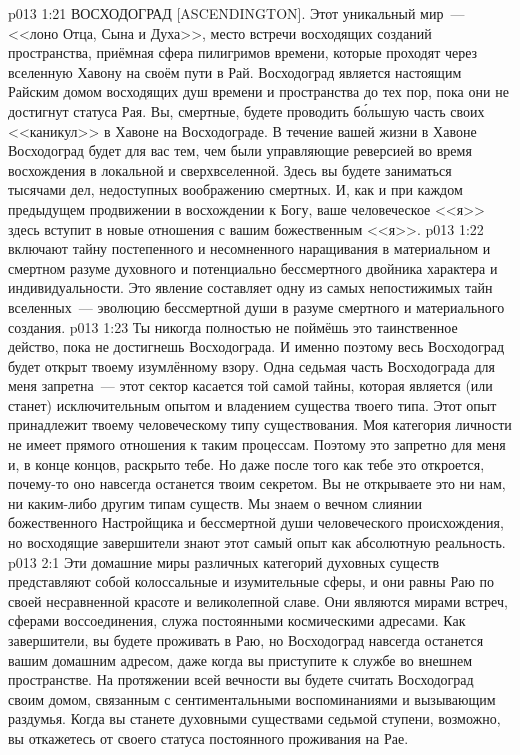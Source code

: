 \vs p013 1:21 ВОСХОДОГРАД [ASCENDINGTON]. Этот уникальный мир~--- <<лоно Отца, Сына и Духа>>, место встречи восходящих созданий пространства, приёмная сфера пилигримов времени, которые проходят через вселенную Хавону на своём пути в Рай. Восходоград является настоящим Райским домом восходящих душ времени и пространства до тех пор, пока они не достигнут статуса Рая. Вы, смертные, будете проводить б\'ольшую часть своих <<каникул>> в Хавоне на Восходограде. В течение вашей жизни в Хавоне Восходоград будет для вас тем, чем были управляющие реверсией во время восхождения в локальной и сверхвселенной. Здесь вы будете заниматься тысячами дел, недоступных воображению смертных. И, как и при каждом предыдущем продвижении в восхождении к Богу, ваше человеческое <<я>> здесь вступит в новые отношения с вашим божественным <<я>>.
\vs p013 1:22 \pc {} включают тайну постепенного и несомненного наращивания в материальном и смертном разуме духовного и потенциально бессмертного двойника характера и индивидуальности. Это явление составляет одну из самых непостижимых тайн вселенных~--- эволюцию бессмертной души в разуме смертного и материального создания.
\vs p013 1:23 Ты никогда полностью не поймёшь это таинственное действо, пока не достигнешь Восходограда. И именно поэтому весь Восходоград будет открыт твоему изумлённому взору. Одна седьмая часть Восходограда для меня запретна~--- этот сектор касается той самой тайны, которая является (или станет) исключительным опытом и владением существа твоего типа. Этот опыт принадлежит твоему человеческому типу существования. Моя категория личности не имеет прямого отношения к таким процессам. Поэтому это запретно для меня и, в конце концов, раскрыто тебе. Но даже после того как тебе это откроется, почему\hyp{}то оно навсегда останется твоим секретом. Вы не открываете это ни нам, ни каким\hyp{}либо другим типам существ. Мы знаем о вечном слиянии божественного Настройщика и бессмертной души человеческого происхождения, но восходящие завершители знают этот самый опыт как абсолютную реальность.
\vs p013 2:1 Эти домашние миры различных категорий духовных существ представляют собой колоссальные и изумительные сферы, и они равны Раю по своей несравненной красоте и великолепной славе. Они являются мирами встреч, сферами воссоединения, служа постоянными космическими адресами. Как завершители, вы будете проживать в Раю, но Восходоград навсегда останется вашим домашним адресом, даже когда вы приступите к службе во внешнем пространстве. На протяжении всей вечности вы будете считать Восходоград своим домом, связанным с сентиментальными воспоминаниями и вызывающим раздумья. Когда вы станете духовными существами седьмой ступени, возможно, вы откажетесь от своего статуса постоянного проживания на Рае.
